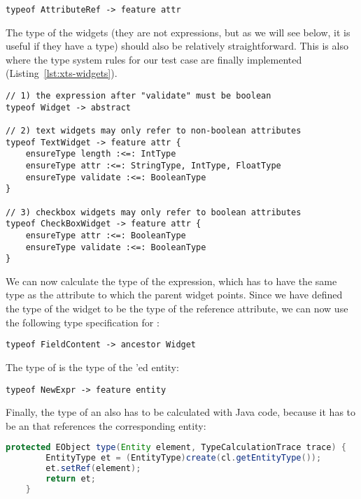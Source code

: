 \begin{lstlisting}[language=xts]
typeof AttributeRef -> feature attr
\end{lstlisting}

The type of the widgets (they are not expressions, but as we will see below, it
is useful if they have a type) should also be relatively straightforward. This
is also where  the type system rules for our test case are finally implemented
(Listing~\ref{lst:xts-widgets}).

\begin{lstlisting}[language=xts,float,label=lst:xts-widgets,caption=Rules
for widgets.] 
// 1) the expression after "validate" must be boolean
typeof Widget -> abstract

// 2) text widgets may only refer to non-boolean attributes 
typeof TextWidget -> feature attr {
    ensureType length :<=: IntType
    ensureType attr :<=: StringType, IntType, FloatType
    ensureType validate :<=: BooleanType
}  

// 3) checkbox widgets may only refer to boolean attributes
typeof CheckBoxWidget -> feature attr {
    ensureType attr :<=: BooleanType
    ensureType validate :<=: BooleanType
}
\end{lstlisting}


We can now calculate the type of the  expression, which has to have
the same type as  the attribute to which the parent widget points. Since we
have defined the type of the widget to be the type of the reference attribute,
we can now use the following type specification for :

\begin{lstlisting}[language=xts]
typeof FieldContent -> ancestor Widget
\end{lstlisting}

The type of  is the type of the 'ed entity:

\begin{lstlisting}[language=xts]
    typeof NewExpr -> feature entity
\end{lstlisting}

 Finally, the type of an  also has to be calculated with Java code, because
 it has to be an  that references the corresponding entity:

\begin{lstlisting}[language=Java]
    protected EObject type(Entity element, TypeCalculationTrace trace) {
        EntityType et = (EntityType)create(cl.getEntityType());
        et.setRef(element);
        return et;
    }
\end{lstlisting}

